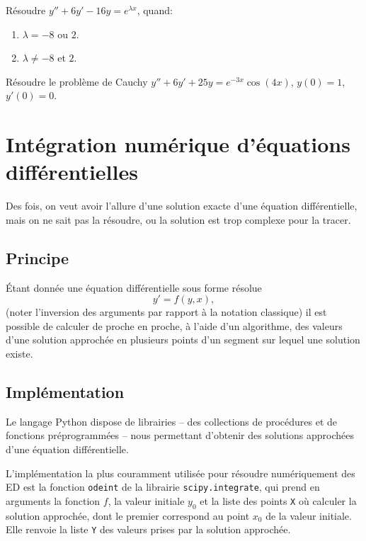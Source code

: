 \documentclass[../main.tex]{subfiles}
\begin{document}
\begin{exo}
	Résoudre $y''+6y'-16y = e^{\lambda x}$, quand:\begin{enumerate}
		\item $\lambda = -8$ ou $2$.
		\item $\lambda\neq -8$ et $2$.
	\end{enumerate}
\end{exo}

\begin{exo}
	Résoudre le problème de Cauchy $y''+6y'+25y = e^{-3x}\cos(4x)$, $y(0)=1$, $y'(0)=0$.
\end{exo}
\section{Intégration numérique d'équations différentielles}

Des fois, on veut avoir l'allure d'une solution exacte d'une équation différentielle, mais on ne sait pas la résoudre, ou la solution est trop complexe pour la tracer. 

\subsection{Principe}

Étant donnée une équation différentielle sous forme résolue
	\begin{equation}\label{intNum}
		y' = f(y,x),
	\end{equation}
(noter l'inversion des arguments par rapport à la notation classique) il est possible de calculer de proche en proche, à l'aide d'un algorithme, des valeurs d'une solution approchée en plusieurs points d'un segment sur lequel une solution existe.

\subsection{Implémentation}

Le langage \textsf{Python} dispose de librairies -- des collections de procédures et de fonctions préprogrammées -- nous permettant d'obtenir des solutions approchées d'une équation différentielle.

L'implémentation la plus couramment utilisée pour résoudre numériquement des ED est la fonction \texttt{odeint} de la librairie \texttt{scipy.integrate}, qui prend en arguments la fonction $f$, la valeur initiale $y_0$ et la liste des points \texttt{X} où calculer la solution approchée, dont le premier correspond au point $x_0$ de la valeur initiale. Elle renvoie la liste \texttt{Y} des valeurs prises par la solution approchée.
\end{document}
